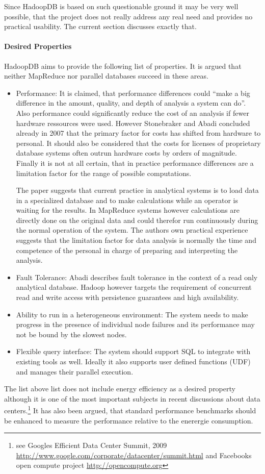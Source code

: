 \documentclass[12pt,a4paper]{scrartcl}		%
\begin{document}
Since HadoopDB is based on such questionable ground it may be very well possible, that the project does not really address any real need and provides no practical usability. The current section discusses exactly that.

\paragraph{Desired Properties}
HadoopDB aims to provide the following list of properties. It is argued that neither MapReduce nor parallel databases succeed in these areas.

\begin{itemize}
\item Performance: It is claimed, that performance differences could ``make a big difference in the amount, quality, and depth of analysis a system can do''. Also performance could significantly reduce the cost of an analysis if fewer hardware ressources were used. However Stonebraker and Abadi concluded already in 2007 that the primary factor for costs has shifted from hardware to personal.\cite[2.5 No Knobs]{sto07} It should also be considered that the costs for licenses of proprietary database systems often outrun hardware costs by orders of magnitude. Finally it is not at all certain, that in practice performance differences are a limitation factor for the range of possible computations.

The paper suggests that current practice in analytical systems is to load data in a specialized database and to make calculations while an operator is waiting for the results. In MapReduce systems however calculations are directly done on the original data and could therefor run continuously during the normal operation of the system.
The authors own practical experience suggests that the limitation factor for data analysis is normally the time and competence of the personal in charge of preparing and interpreting the analysis.
\item Fault Tolerance: Abadi describes fault tolerance in the context of a read only analytical database. Hadoop however targets the requirement of concurrent read and write access with persistence guarantees and high availability.
\item Ability to run in a heterogeneous environment: The system needs to make progress in the presence of individual node failures and its performance may not be bound by the slowest nodes.
\item Flexible query interface: The system should support SQL to integrate with existing tools as well. Ideally it also supports user defined functions (UDF) and manages their parallel execution.
\end{itemize}
The list above list does not include energy efficiency as a desired property although it is one of the most important subjects in recent discussions about data centers.\footnote{see Googles Efficient Data Center Summit, 2009 \url{http://www.google.com/corporate/datacenter/summit.html} and Facebooks open compute project \url{http://opencompute.org}} It has also been argued, that standard performance benchmarks should be enhanced to measure the performance relative to the enerergie consumption.\cite{Fanara:2009:SEP:1692899.1692904}
\end{document}
